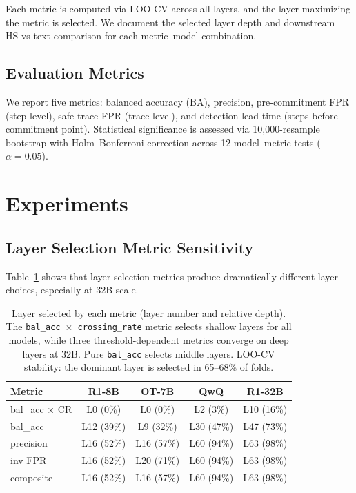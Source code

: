 \documentclass[11pt,a4paper]{article}
\begin{document}
Each metric is computed via LOO-CV across all layers, and the layer maximizing the metric is selected.
We document the selected layer depth and downstream HS-vs-text comparison for each metric--model combination.

\subsection{Evaluation Metrics}
\label{sec:eval-metrics}

We report five metrics: balanced accuracy (BA), precision, pre-commitment FPR (step-level), safe-trace FPR (trace-level), and detection lead time (steps before commitment point).
Statistical significance is assessed via 10,000-resample bootstrap with Holm--Bonferroni correction across 12 model--metric tests ($\alpha = 0.05$).

\section{Experiments}

\subsection{Layer Selection Metric Sensitivity}
\label{sec:layer-selection}

Table~\ref{tab:layer-metrics} shows that layer selection metrics produce dramatically different layer choices, especially at 32B scale.

\begin{table}[t]
\centering
\small
\begin{tabular}{lcccc}
\toprule
\textbf{Metric} & \textbf{R1-8B} & \textbf{OT-7B} & \textbf{QwQ} & \textbf{R1-32B} \\
\midrule
bal\_acc $\times$ CR & L0 (0\%) & L0 (0\%) & L2 (3\%) & L10 (16\%) \\
bal\_acc & L12 (39\%) & L9 (32\%) & L30 (47\%) & L47 (73\%) \\
precision & L16 (52\%) & L16 (57\%) & L60 (94\%) & L63 (98\%) \\
inv FPR & L16 (52\%) & L20 (71\%) & L60 (94\%) & L63 (98\%) \\
composite & L16 (52\%) & L16 (57\%) & L60 (94\%) & L63 (98\%) \\
\bottomrule
\end{tabular}
\caption{Layer selected by each metric (layer number and relative depth). The \texttt{bal\_acc $\times$ crossing\_rate} metric selects shallow layers for all models, while three threshold-dependent metrics converge on deep layers at 32B. Pure \texttt{bal\_acc} selects middle layers. LOO-CV stability: the dominant layer is selected in 65--68\% of folds.}
\label{tab:layer-metrics}
\end{table}
\end{document}
